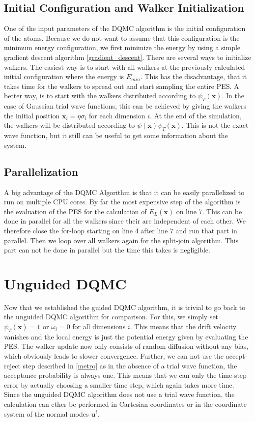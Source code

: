 \documentclass [12pt]{report}
\begin{document}
\subsection{Initial Configuration and Walker Initialization}
One of the input parameters of the DQMC algorithm is the initial configuration of the atoms. Because we do not want to assume that this configuration is the minimum energy configuration, we first minimize the energy by using a simple gradient descent algorithm \ref{gradient_descent}.
There are several ways to initialize walkers. The easiest way is to start with all walkers at the previously calculated initial configuration where the energy is $E^e_{min}$. This has the disadvantage, that it takes time for the walkers to spread out and start sampling the entire PES. A better way, is to start with the walkers distributed according to $\psi_T(\bm{x})$. In the case of Gaussian trial wave functions, this can be achieved by giving the walkers the initial position $\bm{x}_i = \eta \sigma_i$ for each dimension $i$.
At the end of the simulation, the walkers will be distributed according to $\psi(\bm{x})\psi_T(\bm{x})$. This is not the exact wave function, but it still can be useful to get some information about the system.
\subsection{Parallelization}
A big advantage of the DQMC Algorithm is that it can be easily parallelized to run on multiple CPU cores. By far the most expensive step of the algorithm is the evaluation of the PES for the calculation of $E_L(\bm{x})$ on line 7. This can be done in parallel for all the walkers since their are independent of each other. We therefore close the for-loop starting on line 4 after line 7 and run that part in parallel. Then we loop over all walkers again for the split-join algorithm. This part can not be done in parallel but the time this takes is negligible.

\section{Unguided DQMC} \label{uDQMC}
Now that we established the guided DQMC algorithm, it is trivial to go back to the unguided DQMC algorithm for comparison. For this, we simply set $\psi_T(\bm{x}) = 1$ or $\omega_i = 0$ for all dimensions $i$. This means that the drift velocity vanishes and the local energy is just the potential energy given by evaluating the PES. The walker update now only consists of random diffusion without any bias, which obviously leads to slower convergence. Further, we can not use the accept-reject step described in \ref{metro} as in the absence of a trial wave function, the acceptance probability is always one. This means that we can only the time-step error by actually choosing a smaller time step, which again takes more time. Since the unguided DQMC algorithm does not use a trial wave function, the calculation can ether be performed in Cartesian coordinates or in the coordinate system of the normal modes $\bm{u}^i$.
\end{document}
